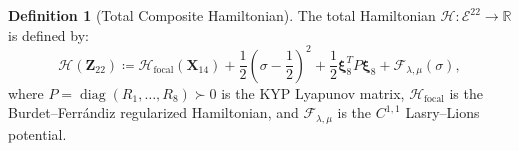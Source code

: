 \documentclass[11pt,a4paper,reqno]{article}
\theoremstyle{plain}
\theoremstyle{definition}
\newtheorem{definition}[theorem]{Definition}
\theoremstyle{remark}
\numberwithin{equation}{section}
\begin{document}
\begin{definition}[Total Composite Hamiltonian]
The total Hamiltonian $\mathcal{H} : \mathcal{E}^{22} \to \mathbb{R}$ is defined by:
\begin{equation}
  \mathcal{H}(\bm{Z}_{22}) \coloneqq \mathcal{H}_{\mathrm{focal}}(\bm{X}_{14}) + \frac{1}{2} \left( \sigma - \frac{1}{2} \right)^2 + \frac{1}{2} \bm{\xi}_8^T P \bm{\xi}_8 + \mathcal{F}_{\lambda,\mu}(\sigma),
  \label{eq:composite_hamiltonian}
\end{equation}
where $P = \operatorname{diag}(R_1, \dots, R_8) \succ 0$ is the KYP Lyapunov matrix, $\mathcal{H}_{\mathrm{focal}}$ is the Burdet--Ferr\'{a}ndiz regularized Hamiltonian, and $\mathcal{F}_{\lambda,\mu}$ is the $C^{1,1}$ Lasry--Lions potential.
\end{definition}
\end{document}
